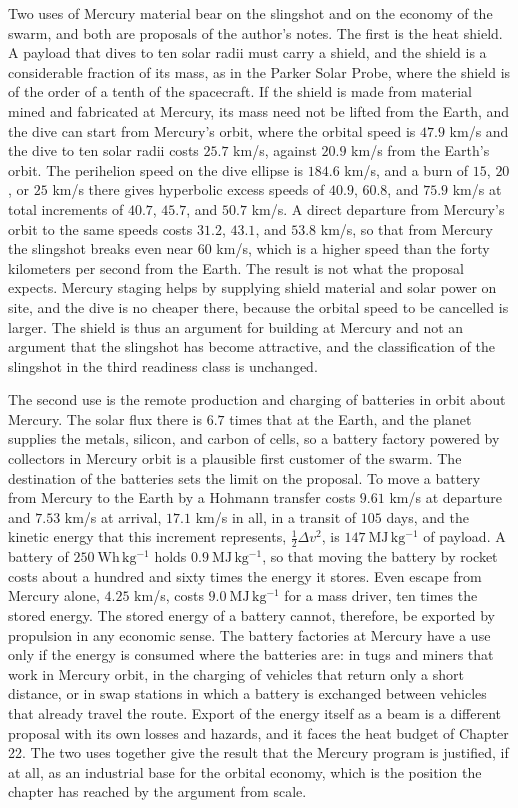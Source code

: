 Two uses of Mercury material bear on the slingshot and on the economy of the swarm, and both are proposals of the author's notes. The first is the heat shield. A payload that dives to ten solar radii must carry a shield, and the shield is a considerable fraction of its mass, as in the Parker Solar Probe, where the shield is of the order of a tenth of the spacecraft. If the shield is made from material mined and fabricated at Mercury, its mass need not be lifted from the Earth, and the dive can start from Mercury's orbit, where the orbital speed is $47.9$ km/s and the dive to ten solar radii costs $25.7$ km/s, against $20.9$ km/s from the Earth's orbit. The perihelion speed on the dive ellipse is $184.6$ km/s, and a burn of $15$, $20$, or $25$ km/s there gives hyperbolic excess speeds of $40.9$, $60.8$, and $75.9$ km/s at total increments of $40.7$, $45.7$, and $50.7$ km/s. A direct departure from Mercury's orbit to the same speeds costs $31.2$, $43.1$, and $53.8$ km/s, so that from Mercury the slingshot breaks even near $60$ km/s, which is a higher speed than the forty kilometers per second from the Earth. The result is not what the proposal expects. Mercury staging helps by supplying shield material and solar power on site, and the dive is no cheaper there, because the orbital speed to be cancelled is larger. The shield is thus an argument for building at Mercury and not an argument that the slingshot has become attractive, and the classification of the slingshot in the third readiness class is unchanged.

The second use is the remote production and charging of batteries in orbit about Mercury. The solar flux there is $6.7$ times that at the Earth, and the planet supplies the metals, silicon, and carbon of cells, so a battery factory powered by collectors in Mercury orbit is a plausible first customer of the swarm. The destination of the batteries sets the limit on the proposal. To move a battery from Mercury to the Earth by a Hohmann transfer costs $9.61$ km/s at departure and $7.53$ km/s at arrival, $17.1$ km/s in all, in a transit of $105$ days, and the kinetic energy that this increment represents, $\tfrac12\Delta v^2$, is $147\ \mathrm{MJ\,kg^{-1}}$ of payload. A battery of $250\ \mathrm{Wh\,kg^{-1}}$ holds $0.9\ \mathrm{MJ\,kg^{-1}}$, so that moving the battery by rocket costs about a hundred and sixty times the energy it stores. Even escape from Mercury alone, $4.25$ km/s, costs $9.0\ \mathrm{MJ\,kg^{-1}}$ for a mass driver, ten times the stored energy. The stored energy of a battery cannot, therefore, be exported by propulsion in any economic sense. The battery factories at Mercury have a use only if the energy is consumed where the batteries are: in tugs and miners that work in Mercury orbit, in the charging of vehicles that return only a short distance, or in swap stations in which a battery is exchanged between vehicles that already travel the route. Export of the energy itself as a beam is a different proposal with its own losses and hazards, and it faces the heat budget of Chapter 22. The two uses together give the result that the Mercury program is justified, if at all, as an industrial base for the orbital economy, which is the position the chapter has reached by the argument from scale.

